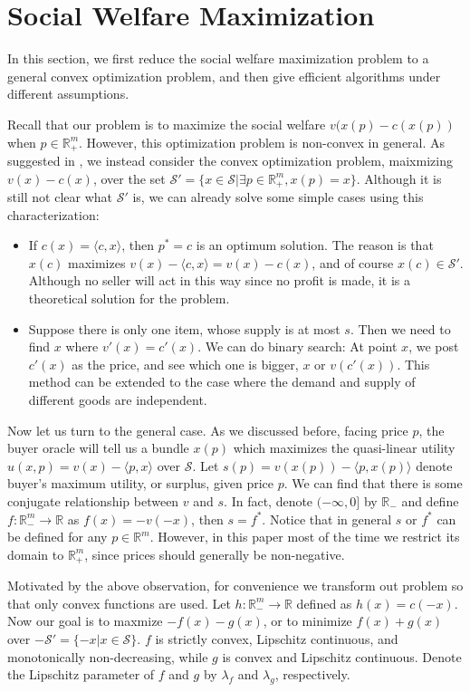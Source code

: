 \documentclass{article}
\begin{document}
\section{Social Welfare Maximization}
In this section, we first reduce the social welfare maximization problem to a general convex optimization problem, and then give efficient algorithms under different assumptions.

Recall that our problem is to maximize the social welfare $v(x(p)-c(x(p))$ when $p\in \mathbb{R}_+^m$. However, this optimization problem is non-convex in general. As suggested in \cite{RUW15}, we instead consider the convex optimization problem, maixmizing $v(x)-c(x)$, over the set $\mathcal{S}'=\{x\in \mathcal{S}|\exists p\in \mathbb{R}^m_+,x(p)=x\}$. Although it is still not clear what $\mathcal{S}'$ is, we can already solve some simple cases using this characterization:
\begin{itemize}
    \item If $c(x)=\langle c,x\rangle$, then $p^*=c$ is an optimum solution. The reason is that $x(c)$ maximizes $v(x)-\langle c,x\rangle=v(x)-c(x)$, and of course $x(c)\in \mathcal{S}'$. Although no seller will act in this way since no profit is made, it is a theoretical solution for the problem.

    \item Suppose there is only one item, whose supply is at most $s$. Then we need to find $x$ where $v'(x)=c'(x)$. We can do binary search: At point $x$, we post $c'(x)$ as the price, and see which one is bigger, $x$ or $v(c'(x))$. This method can be extended to the case where the demand and supply of different goods are independent.
\end{itemize}

Now let us turn to the general case. As we discussed before, facing price $p$, the buyer oracle will tell us a bundle $x(p)$ which maximizes the quasi-linear utility $u(x,p)=v(x)-\langle p,x\rangle$ over $\mathcal{S}$. Let $s(p)=v(x(p))-\langle p,x(p)\rangle$ denote buyer's maximum utility, or surplus, given price $p$. We can find that there is some conjugate relationship between $v$ and $s$. In fact, denote $(-\infty,0]$ by $\mathbb{R}_-$ and define $f:\mathbb{R}_-^m\to \mathbb{R}$ as $f(x)=-v(-x)$, then $s=f^*$. Notice that in general $s$ or $f^*$ can be defined for any $p\in \mathbb{R}^m$. However, in this paper most of the time we restrict its domain to $\mathbb{R}^m_+$, since prices should generally be non-negative.

Motivated by the above observation, for convenience we transform out problem so that only convex functions are used. Let $h:\mathbb{R}_-^m\to \mathbb{R}$ defined as $h(x)=c(-x)$. Now our goal is to maxmize $-f(x)-g(x)$, or to minimize $f(x)+g(x)$ over $-\mathcal{S}'=\{-x|x\in \mathcal{S}\}$. $f$ is strictly convex, Lipschitz continuous, and monotonically non-decreasing, while $g$ is convex and  Lipschitz continuous. Denote the Lipschitz parameter of $f$ and $g$ by $\lambda_f$ and $\lambda_g$, respectively.
\end{document}
